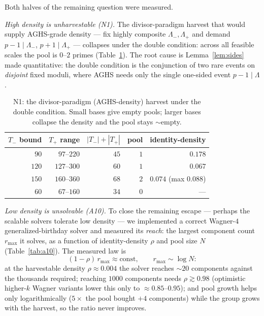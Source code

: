 \documentclass[11pt]{article}
\theoremstyle{remark}
\begin{document}
Both halves of the remaining question were measured.

\emph{High density is unharvestable (N1).} The divisor-paradigm harvest
that would supply AGHS-grade density --- fix highly composite
$\Lambda_-, \Lambda_+$ and demand $p - 1 \mid \Lambda_-$,
$p + 1 \mid \Lambda_+$ --- collapses under the double condition: across
all feasible scales the pool is $0$--$2$ primes
(Table~\ref{tab:n1}). The root cause is Lemma~\ref{lem:sides} made
quantitative: the double condition is the conjunction of two rare events
on \emph{disjoint} fixed moduli, where AGHS needs only the single
one-sided event $p - 1 \mid \Lambda$.

\begin{table}[ht]\centering\small
\begin{tabular}{@{}rrrrr@{}}
\toprule
$T_-$ bound & $T_+$ range & $|T_-| + |T_+|$ & pool & identity-density \\
\midrule
$90$ & $97$--$220$ & $45$ & $1$ & $0.178$ \\
$120$ & $127$--$300$ & $60$ & $1$ & $0.067$ \\
$150$ & $160$--$360$ & $68$ & $2$ & $0.074$ (max $0.088$) \\
$60$ & $67$--$160$ & $34$ & $0$ & --- \\
\bottomrule
\end{tabular}
\caption{N1: the divisor-paradigm (AGHS-density) harvest under the double
condition. Small bases give empty pools; larger bases collapse the density
and the pool stays ${\sim}$empty.}
\label{tab:n1}
\end{table}

\emph{Low density is unsolvable (A10).} To close the remaining escape ---
perhaps the scalable solvers tolerate low density --- we implemented a
correct Wagner-$4$ generalized-birthday solver \cite{Wagner} and measured
its \emph{reach}: the largest component count $r_{\max}$ it solves, as a
function of identity-density $\rho$ and pool size $N$
(Table~\ref{tab:a10}). The measured law is
\[
(1 - \rho)\, r_{\max} \approx \text{const}, \qquad
r_{\max} \sim \log N :
\]
at the harvestable density $\rho \approx 0.004$ the solver reaches
${\sim}20$ components against the thousands required; reaching $1000$
components needs $\rho \gtrsim 0.98$ (optimistic higher-$k$ Wagner
variants lower this only to ${\approx}0.85$--$0.95$); and pool growth
helps only logarithmically ($5\times$ the pool bought $+4$ components)
while the group grows with the harvest, so the ratio never improves.
\end{document}
